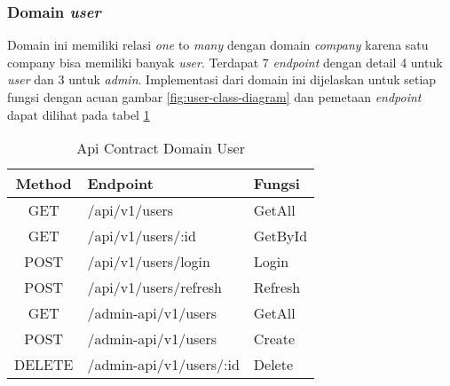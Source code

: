 \subsubsection{Domain \textit{user}}

Domain ini memiliki relasi \textit{one} to \textit{many} dengan domain \textit{company} karena satu company bisa memiliki banyak \textit{user}. Terdapat 7 \textit{endpoint} dengan detail 4 untuk \textit{user} dan 3 untuk \textit{admin}. Implementasi dari domain ini dijelaskan untuk setiap fungsi dengan acuan gambar \ref{fig:user-class-diagram} dan pemetaan \textit{endpoint} dapat dilihat pada tabel \ref{tab:api-contract-domain-user}

\bgroup
\begin{table}[ht]
  \caption{Api Contract Domain User}
  \label{tab:api-contract-domain-user}
  \def\arraystretch{1.7}
  \centering
  \begin{tabular}{|c|p{6cm}|p{4cm}|}
    \hline
    Method & Endpoint                &
    Fungsi                                     \\
    \hline
    GET    & /api/v1/users           & GetAll  \\
    \hline
    GET    & /api/v1/users/:id       & GetById \\
    \hline
    POST   & /api/v1/users/login     & Login   \\
    \hline
    POST   & /api/v1/users/refresh   & Refresh \\
    \hline
    GET    & /admin-api/v1/users     & GetAll  \\
    \hline
    POST   & /admin-api/v1/users     & Create  \\
    \hline
    DELETE & /admin-api/v1/users/:id & Delete  \\
    \hline
  \end{tabular}
\end{table}
\egroup

\pagebreak

